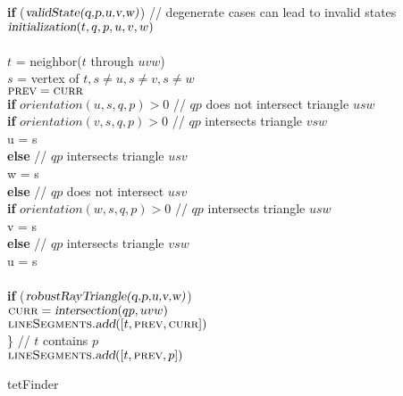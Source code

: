 \documentclass[../thesis.tex]{subfiles}
\begin{document}
\begin{algo*}
{\begin{numbertabbing}
      \> \> \textbf{if} ($\textsl{validState(q,p,u,v,w)}$) // degenerate cases can lead to invalid states \label{}\\
      \> \> \> $\textsl{initialization}(t, q,p,u,v,w)$ \label{}\\
      \\
      \> \> $t$ = neighbor($t$ through $uvw$) \label{}\\
      \> \> $s$ = vertex of $t, s \neq u, s \neq v, s \neq w$ \label{}\\
      \> \> $\textsc{prev} = \textsc{curr}$ \label{}\\
      \> \> \textbf{if} $orientation(u,s,q,p) > 0$ // $qp$ does not intersect triangle $usw$\label{}\\
      \> \> \> \textbf{if} $orientation(v,s,q,p) > 0$ // $qp$ intersects triangle $vsw$ \label{}\\
      \> \> \> \> u = s \label{}\\
      \> \> \> \textbf{else} // $qp$ intersects triangle $usv$ \label{}\\
      \> \> \> \> w = s \label{}\\
      \> \> \textbf{else} // $qp$ does not intersect $usv$ \label{}\\
      \> \> \> \textbf{if} $orientation(w,s,q,p) > 0$ // $qp$ intersects triangle $usw$ \label{}\\
      \> \> \> \> v = s \label{}\\
      \> \> \> \textbf{else} // $qp$ intersects triangle $vsw$ \label{}\\
      \> \> \> \> u = s \label{}\\
      \\
      \> \> \textbf{if} ($\textsl{robustRayTriangle(q,p,u,v,w)}$)\label{}\\
      \> \> \> $\textsc{curr} = \textsl{intersection}(qp, uvw)$ \label{}\\
      \> \> \> $\textsc{lineSegments}.\textsl{add}([t, \textsc{prev}, \textsc{curr}])$ \label{}\\
      \> \} // $t$ contains $p$ \label{}\\
      \> $\textsc{lineSegments}.\textsl{add}([t, \textsc{prev}, p])$ \label{}\\
    \end{numbertabbing}
  }
  \caption{tetFinder}
  \label{alg:tetFinder}
\end{algo*}
  
\end{document}

